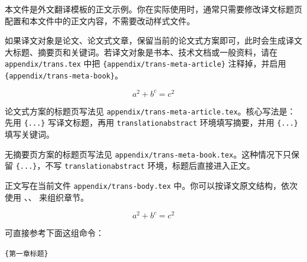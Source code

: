 %
%
%

本文件是外文翻译模板的正文示例。你在实际使用时，通常只需要修改译文标题页配置和本文件中的正文内容，不需要改动样式文件。

如果译文对象是论文、论文式文章，保留当前的论文式方案即可，此时会生成译文大标题、摘要页和关键词。若译文对象是书本、技术文档或一般资料，请在 \texttt{appendix/trans.tex} 中把 \texttt{\string\{appendix/trans-meta-article\}} 注释掉，并启用 \texttt{\string\{appendix/trans-meta-book\}}。

\begin{equation}
    a^2+b^c=c^2
\end{equation}


论文式方案的标题页写法见 \texttt{appendix/trans-meta-article.tex}。核心写法是：先用 \texttt{\string\appendixtranslationtitle\{...\}} 写译文标题，再用 \texttt{translationabstract} 环境填写摘要，并用 \texttt{\string\translationkeywords\{...\}} 填写关键词。


无摘要页方案的标题页写法见 \texttt{appendix/trans-meta-book.tex}。这种情况下只保留 \texttt{\string\appendixtranslationtitle\{...\}}，不写 \texttt{translationabstract} 环境，标题后直接进入正文。


正文写在当前文件 \texttt{appendix/trans-body.tex} 中。你可以按译文原文结构，依次使用 \texttt{\string\translationsection}、\texttt{\string\translationsubsection}、\texttt{\string\translationsubsubsection} 来组织章节。

\begin{equation}
    a^2+b^c=c^2
\end{equation}

可直接参考下面这组命令：

\texttt{\string\translationsection\{第一章标题\}}

